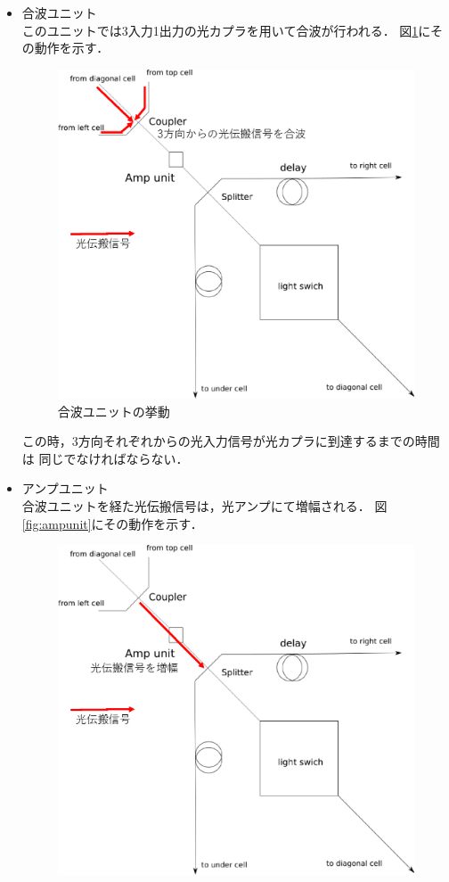\begin{itemize}
\item 合波ユニット\\
このユニットでは3入力1出力の光カプラを用いて合波が行われる．
図\ref{fig:couplerunit}にその動作を示す．
\begin{figure}[t!]
\begin{center}
\includegraphics[keepaspectratio,scale=0.4]{fig/3/lightracelogic_cell_6_1.eps}
\caption{合波ユニットの挙動}
\label{fig:couplerunit}
\end{center}
\end{figure}
この時，3方向それぞれからの光入力信号が光カプラに到達するまでの時間は
同じでなければならない．
\item アンプユニット\\
合波ユニットを経た光伝搬信号は，光アンプにて増幅される．
図\ref{fig:ampunit}にその動作を示す．
\begin{figure}[t!]
\begin{center}
\includegraphics[keepaspectratio,scale=0.4]{fig/3/lightracelogic_cell_6_2.eps}

\end{center}
\end{figure}
\end{itemize}
